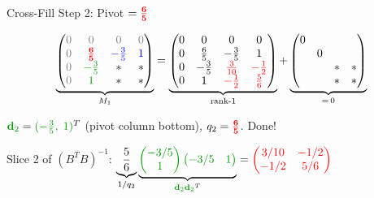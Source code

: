 \documentclass[10pt]{beamer}
\theoremstyle{definition}
\newcommand{\pvt}[1]{{\color{red}\mathbf{#1}}}       %
\newcommand{\crs}[1]{{\color{blue}#1}}                %
\newcommand{\gn}[1]{{\color{green!60!black}#1}}       %
\newcommand{\rd}[1]{{\color{red}#1}}                  %
\newcommand{\gz}{{\color{gray}0}}                      %
\begin{document}
\begin{frame}{Cross-Fill Step 2: Pivot $= \pvt{\tfrac{6}{5}}$}

$$\underbrace{\begin{pmatrix} \gz & \gz & \gz & \gz \\ \gz & \pvt{\tfrac{6}{5}} & \crs{{-}\tfrac{3}{5}} & \crs{1} \\ \gz & \gn{{-}\tfrac{3}{5}} & * & * \\ \gz & \gn{1} & * & * \end{pmatrix}}_{M_1}
= \underbrace{\begin{pmatrix} 0 & 0 & 0 & 0 \\ 0 & \tfrac{6}{5} & {-}\tfrac{3}{5} & 1 \\ 0 & {-}\tfrac{3}{5} & \rd{\tfrac{3}{10}} & \rd{{-}\tfrac{1}{2}} \\ 0 & 1 & \rd{{-}\tfrac{1}{2}} & \rd{\tfrac{5}{6}} \end{pmatrix}}_{\text{rank-1}}
+ \underbrace{\begin{pmatrix} 0 \\ & 0 \\ & & * & * \\ & & * & * \end{pmatrix}}_{= \, 0}$$

\vspace{0.3em}

$\gn{\mathbf{d}_2} = \gn{({-}\tfrac{3}{5},\; 1)}^T$ (pivot column bottom), \; $q_2 = \pvt{\tfrac{6}{5}}$. \; Done!

\vspace{0.2em}

Slice 2 of $(B^TB)^{-1}$: \; $\underbrace{\dfrac{5}{6}}_{1/q_2}\underbrace{\gn{\begin{pmatrix}-3/5\\1\end{pmatrix}\begin{pmatrix}-3/5&1\end{pmatrix}}}_{\gn{\mathbf{d}_2}\gn{\mathbf{d}_2}^T} = \rd{\begin{pmatrix} 3/10 & -1/2 \\ -1/2 & 5/6 \end{pmatrix}}$

\end{frame}
\end{document}
